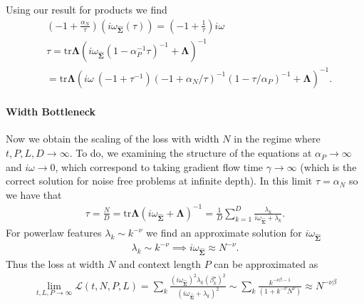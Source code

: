 \documentclass{article} %
\begin{document}
Using our result for products we find
\begin{align}
    &\left( - 1 + \frac{\alpha_{N}}{\tau} \right)    \left( i \omega_{\hat{\bm\Sigma}}(\tau)  \right) = \left( - 1 + \frac{1}{\tau}  \right)  i \omega \nonumber
    \\
    &\tau =   \text{tr} \bm\Lambda \left( i \omega_{\hat{\bm\Sigma}}(1-\alpha_P^{-1} \tau)^{-1} + \bm\Lambda \right)^{-1} \nonumber
    \\
    &=    \text{tr} \bm\Lambda \left(  i\omega \  (-1+\tau^{-1}) (-1 + \alpha_N/\tau)^{-1} (1- \tau / \alpha_P )^{-1}  +  \bm\Lambda \right)^{-1} .
\end{align}

\paragraph{Width Bottleneck} Now we obtain the scaling of the loss with width $N$ in the regime where $t,P,L,D \to \infty$. To do, we examining the structure of the equations at $\alpha_P \to \infty$ and $i \omega \to 0$, which correspond to taking gradient flow time $\gamma \to \infty$ (which is the correct solution for noise free problems at infinite depth). In this limit $\tau =  \alpha_N$ so we have that 
\begin{align}
     \tau = \frac{N}{D} = \text{tr} \bm\Lambda \left( i\omega_{\hat{\bm\Sigma}} + \bm \Lambda \right)^{-1} = \frac{1}{D} \sum_{k=1}^D \frac{\lambda_k}{i\omega_{\hat{\bm\Sigma}} + \lambda_k}.
\end{align}
For powerlaw features $\lambda_k \sim k^{-\nu}$ we find an approximate solution for $i\omega_{\hat{\bm\Sigma}}$
\begin{align}
    \lambda_k \sim k^{-\nu} \implies i\omega_{\hat{\bm\Sigma}} \approx N^{- \nu}  .
\end{align}
Thus the loss at width $N$ and context length $P$ can be approximated as 
\begin{align}
    \lim_{t, L,P \to \infty}  \mathcal L(t, N , P , L ) =   \sum_k \frac{(i\omega_{\hat{\bm\Sigma}} )^2 \lambda_k (\beta^\star_k)^2}{ (  i\omega_{\hat{\bm\Sigma}} + \lambda_k )^2} \sim \sum_k \frac{k^{-\nu\beta-1}}{ ( 1 +  k^{-\nu} N^\nu )  } \approx N^{-\nu\beta}
\end{align}
\end{document}
